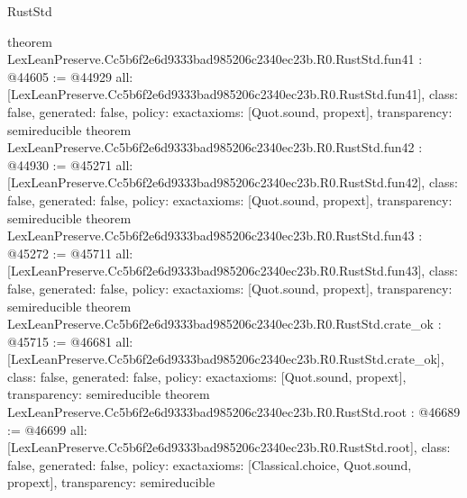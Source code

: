 \begin{lexlean}{RustStd}
\begin{coremodule}
{}
theorem LexLeanPreserve.Cc5b6f2e6d9333bad985206c2340ec23b.R0.RustStd.fun41 : @44605 := @44929 {
  all: [LexLeanPreserve.Cc5b6f2e6d9333bad985206c2340ec23b.R0.RustStd.fun41],
  class: false,
  generated: false,
  policy: exact{axioms: [Quot.sound, propext]},
  transparency: semireducible
}
theorem LexLeanPreserve.Cc5b6f2e6d9333bad985206c2340ec23b.R0.RustStd.fun42 : @44930 := @45271 {
  all: [LexLeanPreserve.Cc5b6f2e6d9333bad985206c2340ec23b.R0.RustStd.fun42],
  class: false,
  generated: false,
  policy: exact{axioms: [Quot.sound, propext]},
  transparency: semireducible
}
theorem LexLeanPreserve.Cc5b6f2e6d9333bad985206c2340ec23b.R0.RustStd.fun43 : @45272 := @45711 {
  all: [LexLeanPreserve.Cc5b6f2e6d9333bad985206c2340ec23b.R0.RustStd.fun43],
  class: false,
  generated: false,
  policy: exact{axioms: [Quot.sound, propext]},
  transparency: semireducible
}
theorem LexLeanPreserve.Cc5b6f2e6d9333bad985206c2340ec23b.R0.RustStd.crate_ok : @45715 := @46681 {
  all: [LexLeanPreserve.Cc5b6f2e6d9333bad985206c2340ec23b.R0.RustStd.crate_ok],
  class: false,
  generated: false,
  policy: exact{axioms: [Quot.sound, propext]},
  transparency: semireducible
}
theorem LexLeanPreserve.Cc5b6f2e6d9333bad985206c2340ec23b.R0.RustStd.root : @46689 := @46699 {
  all: [LexLeanPreserve.Cc5b6f2e6d9333bad985206c2340ec23b.R0.RustStd.root],
  class: false,
  generated: false,
  policy: exact{axioms: [Classical.choice, Quot.sound, propext]},
  transparency: semireducible
}


\end{coremodule}
\end{lexlean}
